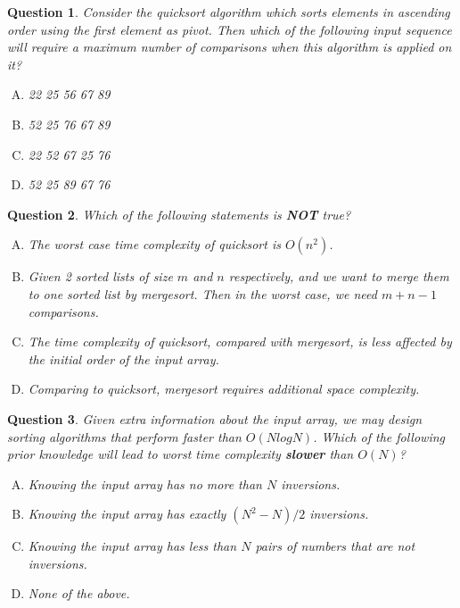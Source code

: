 \documentclass{article}
\newtheorem{Q}{Question}
\begin{document}
\begin{Q}
	Consider the quicksort algorithm which sorts elements in ascending order using the first element as pivot. Then which of the following input sequence will require a maximum number of comparisons when this algorithm is applied on it?
	\begin{enumerate}[(A)]
		\item 22 25 56 67 89
		\item 52 25 76 67 89
		\item 22 52 67 25 76
		\item 52 25 89 67 76
	\end{enumerate}
\end{Q}
\vspace{0.5cm}
\begin{Q}
	Which of the following statements is \textbf{NOT} true?
	\begin{enumerate}[(A)]
		\item The worst case time complexity of quicksort is $O(n^2)$.
		\item Given 2 sorted lists of size $m$ and $n$ respectively, and we want to merge them to one sorted list by mergesort. Then in the worst case, we need $m+n-1$ comparisons.
		\item The time complexity of quicksort, compared with mergesort, is less affected by the initial order of the input array.
		\item Comparing to quicksort, mergesort requires additional space complexity.
	\end{enumerate}
\end{Q}
\vspace{0.5cm}
\begin{Q} Given extra information about the input array, we may design sorting algorithms that perform faster than $O(N log N)$. Which of the following prior knowledge will lead to worst time complexity \textbf{slower} than $O(N)$?
	\begin{enumerate}[(A)]
		\item Knowing the input array has no more than $N$ inversions.
		\item Knowing the input array has exactly $(N^2-N)/2$ inversions.
		\item Knowing the input array has less than $N$ pairs of numbers that are not inversions.
		\item None of the above.
	\end{enumerate}
\end{Q}
\pagebreak
\end{document}
